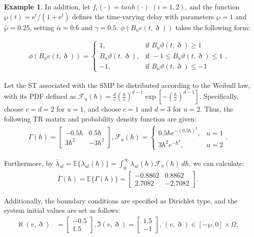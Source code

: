 \documentclass[preprint,review,fleqn,sort&compress,3p]{elsarticle}
\theoremstyle{definition}%
\newtheorem{example}{Example}
\begin{document}
\begin{example}
In addition, let $f_i(\cdot)=tanh(\cdot)$ $(i=1,2)$, and the function $\wp(t)=\mathrm{e}^t/\left(1+\mathrm{e}^t\right)$ defines the time-varying delay with parameters $\wp=1$ and $\bar{\wp}=0.25$, setting $\bar{\alpha}=0.6$ and $\gamma=0.5$. $\phi(B_ue(t,\eth))$ takes the following form:

\begin{align*}
	\phi(B_ue(t,\eth)) =
	\begin{cases}
		1, & \text{if } B_u\vartheta(t,\eth) \geq 1 \\
		B_u\vartheta(t,\eth), & \text{if } -1 \leq B_u\vartheta(t,\eth) \leq 1 \\
		-1, & \text{if } B_u\vartheta(t,\eth) \leq -1
	\end{cases}. 
\end{align*}

Let the ST associated with the SMP be distributed according to the Weibull law, with its PDF defined as $\mathcal{F}_u(\hbar)=\frac{d}{c} \left(\frac{\hbar}{c}\right)^{d-1}\exp\left[  -\left(\frac{\hbar}{c}\right)^{d-1}\right]$. Specifically, choose $c=d=2$ for $u=1$, and choose $c=1$ and $d=3$ for $u=2$. Thus, the following TR matrix and probability density function are given:
\begin{align*}
\Gamma(\hbar)=\begin{bmatrix}
	-0.5\hbar&0.5\hbar\\3\hbar^2&-3\hbar^2
\end{bmatrix},
\mathcal{F}_u(\hbar)=\begin{cases}
	0.5\hbar e^{-(0.5\hbar)^2}, &u=1 \\
	3\hbar^2 e^{-\hbar^3}, &u=2
\end{cases}.
\end{align*}

Furthermore, by $\bar{\lambda}_{ul} = \mathbb{E} \{ \lambda_{ul}(\hbar) \} = \int_0^\infty \lambda_{ul}(\hbar) \mathcal{F}_u(\hbar) \, d\hbar$, we can calculate:
\begin{align*}
\bar{\Gamma}(\hbar) = \mathbb{E} \{ \Gamma(\hbar) \} =
\begin{bmatrix}
	-0.8862&0.8862\\2.7082&-2.7082
\end{bmatrix}.
\end{align*}

Additionally, the boundary conditions are specified as Dirichlet type, and the system initial values are set as follows:
\begin{align*}
	\aleph(v,\eth)&=\begin{bmatrix}
		-0.5\\1.5
	\end{bmatrix},
	\Im(v,\eth)=\begin{bmatrix}
		1.5\\-1
	\end{bmatrix},\,(v, \eth) \in [-\wp, 0] \times \Omega,
\end{align*}


\end{example}
\end{document}
